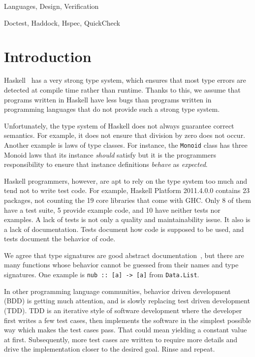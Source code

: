 \documentclass[preprint]{sigplanconf}
\begin{document}

\terms Languages, Design, Verification

\keywords Doctest, Haddock, Hspec, QuickCheck

\section{Introduction}


Haskell~\cite{haskell} has a very strong type system, which ensures that most type errors are
detected at compile time rather than runtime.  Thanks to this, we assume that
programs written in Haskell have less bugs than programs written in programming
languages that do not provide such a strong type system.

Unfortunately, the type system of Haskell does not always guarantee
correct semantics.
For example, it does not ensure that division by zero does not occur.
Another example is laws of type classes.
For instance, the {\tt Monoid} class has three Monoid laws
that its instance \emph{should} satisfy
but
it is the programmers responsibility to ensure that
instance definitions \emph{behave} as \emph{expected}.

Haskell programmers, however, are apt to rely on the type system too
much and tend not to write test code.  For example, Haskell
Platform 2011.4.0.0 contains 23 packages, not counting the 19 core
libraries that come with GHC.  Only 8 of them have a test suite, 5
provide example code, and 10 have neither tests nor examples.
A lack of tests is not only a quality and maintainability issue.  It
also is a lack of documentation.  Tests document how code is supposed
to be used, and tests document the behavior of code.

We agree that type signatures are good abstract documentation~\cite{free}, but
there are many functions whose behavior cannot be guessed from their names and
type signatures.  One example is \verb|nub :: [a] -> [a]| from {\tt Data.List}.

In other programming language communities, behavior driven development
(BDD) is getting much attention, and is slowly replacing test driven
development (TDD).  TDD is an iterative style of software development
where the developer first writes a few test cases, then implements the
software in the simplest possible way which makes the test cases pass.
That could mean yielding a constant value at first.  Subsequently,
more test cases are written to require more details and drive the
implementation closer to the desired goal.  Rinse and repeat.  
\end{document}
